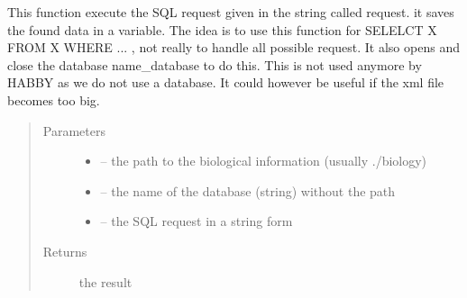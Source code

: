 \documentclass[letterpaper,10pt,english]{sphinxmanual}
\begin{document}
\begin{fulllineitems}
\label{\detokenize{index:src.bio_info.execute_request}}
This function execute the SQL request given in the string called request. it saves the found data in a variable.
The idea is to use this function for SELELCT X FROM X WHERE ... , not really to handle all possible request.
It also opens and close the database name\_database to do this. This is not used anymore by HABBY as we do not use
a database. It could however be useful if the xml file becomes too big.
\begin{quote}\begin{description}
\item[{Parameters}] \leavevmode\begin{itemize}
\item {} 
 -- the path to the biological information (usually ./biology)

\item {} 
 -- the name of the database (string) without the path

\item {} 
 -- the SQL request in a string form

\end{itemize}

\item[{Returns}] \leavevmode
the result

\end{description}\end{quote}

\end{fulllineitems}

\end{document}
